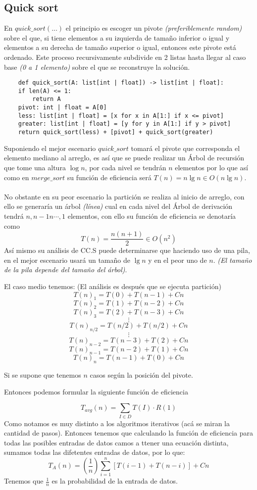 \documentclass[tikz,11pt,fleqn]{book} %
\begin{document}
\subsection{Quick sort}
En $quick\_sort(...)$ el principio es escoger un pivote \textit{(preferiblemente random)} sobre el que, si tiene elementos a su izquierda de tamaño inferior o igual y elementos a su derecha de tamaño superior o igual, entonces este pivote está ordenado. Este proceso recursivamente subdivide en 2 listas hasta llegar al caso base \textit{(0 a 1 elemento)} sobre el que se reconstruye la solución.
\begin{lstlisting}
    def quick_sort(A: list[int | float]) -> list[int | float]:
    if len(A) <= 1:
        return A
    pivot: int | float = A[0]
    less: list[int | float] = [x for x in A[1:] if x <= pivot]
    greater: list[int | float] = [y for y in A[1:] if y > pivot]
    return quick_sort(less) + [pivot] + quick_sort(greater)
\end{lstlisting}
Suponiendo el mejor escenario $quick\_sort$ tomará el pivote que corresponda el elemento mediano al arreglo, es así que se puede realizar un Árbol de recursión que tome una altura $\log n$, por cada nivel se tendrán $n$ elementos por lo que así como en $merge\_sort$ su función de eficiencia será $T(n)=n\lg n\in O(n\lg n)$.
\\\\
No obstante en su peor escenario la partición se realiza al inicio de arreglo, con ello se generaría un árbol \textit{(línea)} cual en cada nivel del Árbol de derivación tendrá $n,n-1n\cdots,1$ elementos, con ello su función de eficiencia se denotaría como
$$T(n)=\frac{n(n+1)}2\in O(n^2)$$
Así mismo su análisis de CC.S puede determinarse que haciendo uso de una pila, en el mejor escenario usará un tamaño de $\lg n$ y en el peor uno de $n$. \textit{(El tamaño de la pila depende del tamaño del árbol)}.

El caso medio tenemos:
(El análisis es después que se ejecuta partición)
$$
	T(n)_1=T(0)+T(n-1)+Cn
$$ $$
	T(n)_2=T(1)+T(n-2)+Cn
$$ $$
	T(n)_3=T(2)+T(n-3)+Cn
$$ $$ \vdots $$ $$
	T(n)_{n/2}=T(n/2)+T(n/2)+Cn
$$ $$ \vdots $$ $$
	T(n)_{n-2}=T(n-3)+T(2)+Cn
$$ $$
	T(n)_{n-1}=T(n-2)+T(1)+Cn
$$ $$
	T(n)_n=T(n-1)+T(0)+Cn
$$

Si se supone que tenemos $n$ casos según la posición del pivote.

Entonces podemos formular la siguiente función de eficiencia

$$
	T_{avg}(n)=\sum_{I\in D}T(I)\cdot R(1)
$$
Como notamos es muy distinto a los algoritmos iterativos (acá se miran la cantidad de pasos). Entonces tenemos que calculando la función de eficiencia para todas las posibles entradas de datos camos a ttener una ecuación distinta, sumamos todas las difetentes entradas de datos, por lo que:
$$
	T_A(n)
	=(\frac1n)\sum_{i=1}^n[T(i-1)+T(n-i)]+Cn
$$
Tenemos que $\frac1n$ es la probabilidad de la entrada de datos.
\end{document}
